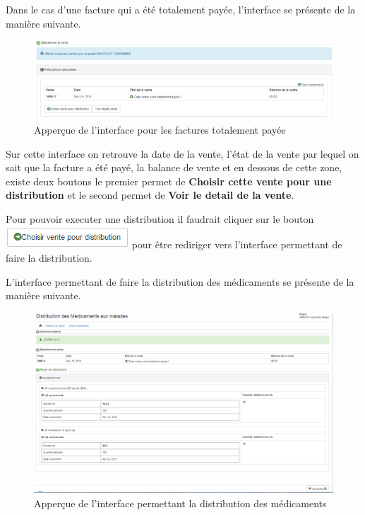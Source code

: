\documentclass[12pt,a4paper]{report}
\begin{document}
Dans le cas d'une facture qui a été totalement payée, l'interface se présente de la manière suivante.

\begin{figure}[h]
\begin{center}
\includegraphics[width=14cm]{pic/TotalPaid.png}
\end{center}
\caption{Apperçue de l'interface pour les factures totalement payée}
\label{Apperçue de l'interface pour les factures totalement payée}
\end{figure}

\newpage

Sur cette interface on retrouve la date de la vente, l'état de la vente par lequel on sait que la facture a été payé, la balance de vente et en dessous de cette zone, existe deux boutons le premier permet de \textbf{Choisir cette vente pour une distribution} et le second permet de \textbf{Voir le detail de la vente}. 

Pour pouvoir executer une distribution il faudrait cliquer sur le bouton \includegraphics[scale=0.7]{pic/ChoisirDistr.png} pour être rediriger vers l'interface permettant de faire la distribution.

L'interface permettant de faire la distribution des médicaments se présente de la manière suivante.

\begin{figure}[h]
\begin{center}
\includegraphics[width=14cm]{pic/DistrMedPatient.png}
\end{center}
\caption{Apperçue de l'interface permettant la distribution des médicaments}
\label{Apperçue de l'interface permettant la distribution des médicaments}
\end{figure}
\end{document}
